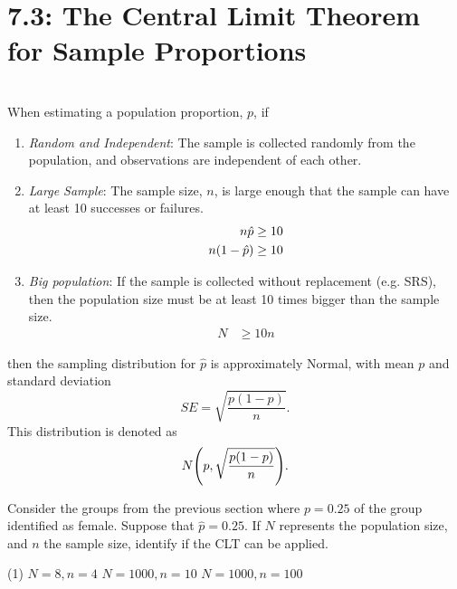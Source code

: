 \documentclass[../mathNotesPreamble]{subfiles}
\providecommand{\relscalefact}{1.4}
\begin{document}
\relscale{\relscalefact}
  \section{7.3: The Central Limit Theorem for Sample Proportions}
  \begin{defn*}\mbox{}\\
    When estimating a population proportion, $p$, if
    \begin{enumerate}
      \item \emph{Random and Independent}: The sample is collected randomly from the population, and observations are independent of each other.
      \item \emph{Large Sample}: The sample size, $n$, is large
        enough that the sample can have at least 10 successes or
        failures.
        \begin{align*}
          n\hat{p}&\geq 10\\
          n{\left(1-\hat{p}\right)}&\geq 10
        \end{align*}
      \item \emph{Big population}: If the sample is collected
        without replacement (e.g. SRS), then the population size must be at
        least 10 times bigger than the sample size.
        \begin{align*}
          N&\geq 10n
        \end{align*}
    \end{enumerate}
    then the sampling distribution for $\hat{p}$ is approximately Normal, with mean $p$ and standard deviation
      \[SE=\sqrt{\frac{p(1-p)}{n}}.\]
    This distribution is denoted as
      \[N{\left(p,\sqrt{\frac{p(1-p)}{n}}\right)}.\]
  \end{defn*}
  \pagebreak

  \begin{ex*}
    Consider the groups from the previous section where $p=0.25$ of the group identified as female. Suppose that $\hat{p}=0.25$. If $N$ represents the population size, and $n$ the sample size, identify if the CLT can be applied.
  \end{ex*}
  \begin{extasks}[after-item-skip=\stretch{1}](1)
    \task $N=8, n=4$
    \task $N=1000, n=10$
    \task $N=1000, n=100$
  \end{extasks}
  \pagebreak
\end{document}

